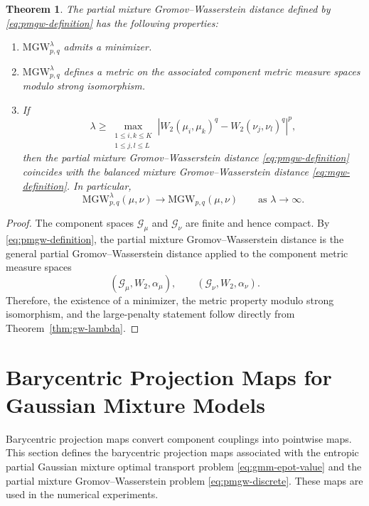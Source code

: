 \documentclass[a4paper,11pt]{article}
\numberwithin{equation}{section}
\newtheorem{thm}{Theorem}[section]
\newcommand{\MGW}{\mathrm{MGW}}
\begin{document}
\begin{thm}\label{thm:pmgw-properties}
The partial mixture Gromov--Wasserstein distance defined by \eqref{eq:pmgw-definition} has the following properties:
\begin{enumerate}[label=\textup{(\roman*)}]
  \item $\MGW^{\lambda}_{p,q}$ admits a minimizer.
  \item $\MGW^{\lambda}_{p,q}$ defines a metric on the associated component metric measure spaces modulo strong isomorphism. 
  \item If
  \begin{equation*}
    \lambda\geq \max_{\substack{1\leq i,k\leq K\\1\leq j,l\leq L}}\left|W_2(\mu_i,\mu_k)^q-W_2(\nu_j,\nu_l)^q\right|^p,
  \end{equation*}
  then the partial mixture Gromov--Wasserstein distance \eqref{eq:pmgw-definition} coincides with the balanced mixture Gromov--Wasserstein distance \eqref{eq:mgw-definition}. In particular,
  \begin{equation*}
    \MGW^{\lambda}_{p,q}(\mu,\nu) \to \MGW_{p,q}(\mu,\nu) \qquad\text{as }\lambda \to \infty.
  \end{equation*}
\end{enumerate}
\end{thm}

\begin{proof}
The component spaces $\mathcal G_\mu$ and $\mathcal G_\nu$ are finite and hence compact. By \eqref{eq:pmgw-definition}, the partial mixture Gromov--Wasserstein distance is the general partial Gromov--Wasserstein distance applied to the component metric measure spaces
\begin{equation*}
  (\mathcal G_\mu,W_2,\alpha_\mu), \qquad (\mathcal G_\nu,W_2,\alpha_\nu).
\end{equation*}
Therefore, the existence of a minimizer, the metric property modulo strong isomorphism, and the large-penalty statement follow directly from Theorem~\ref{thm:gw-lambda}. 
\end{proof}



\section{Barycentric Projection Maps for Gaussian Mixture Models}\label{sec:barycentric}
Barycentric projection maps convert component couplings into pointwise maps. This section defines the barycentric projection maps associated with the entropic partial Gaussian mixture optimal transport problem \eqref{eq:gmm-epot-value} and the partial mixture Gromov--Wasserstein problem \eqref{eq:pmgw-discrete}. These maps are used in the numerical experiments.
\end{document}

